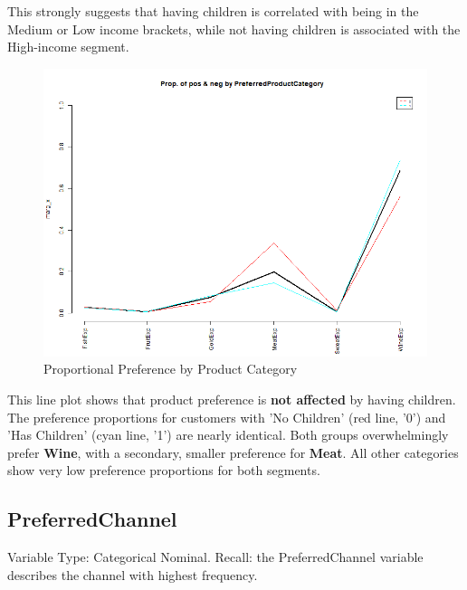 This strongly suggests that having children is correlated with being in the Medium or Low income brackets, while not having children is associated with the High-income segment.

\begin{figure}[H]
    \centering
    \includegraphics[width= 1\linewidth]{Imatges/prop_cond_class_var_x_PreferredProductCategory_6_legend.png}
    \caption{Proportional Preference by Product Category}
    \label{fig:scree_plot_9} %
\end{figure}

This line plot shows that product preference is \textbf{not affected} by having children. The preference proportions for customers with 'No Children' (red line, '0') and 'Has Children' (cyan line, '1') are nearly identical. Both groups overwhelmingly prefer \textbf{Wine}, with a secondary, smaller preference for \textbf{Meat}. All other categories show very low preference proportions for both segments.

\newpage
\subsection{PreferredChannel}
Variable Type: Categorical Nominal. 
Recall: the PreferredChannel variable describes the channel with highest frequency.

